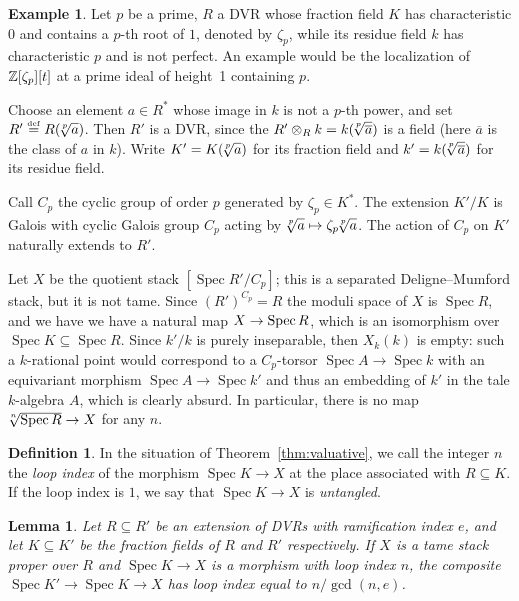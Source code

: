 \documentclass{amsart}
\numberwithin{equation}{section}
\numberwithin{subsection}{section}
\newtheorem{lemma}[theorem]{Lemma}
\theoremstyle{definition}
\newtheorem{definition}[theorem]{Definition}
\newtheorem{example}[theorem]{Example}
\theoremstyle{remark}
\newcommand\arr{\ifinner\to\else\longrightarrow\fi}
\newcommand{\eqdef}{\mathrel{\smash{\overset{\mathrm{\scriptscriptstyle def}} =}}}
\newcommand\spec{\operatorname{Spec}}
\newcommand\radice[2][\relax]{\hspace{-1.5pt}\sqrt[\uproot{2}#1]{#2}}
\begin{document}
\begin{example}\label{counter}
	Let $p$ be a prime, $R$ a DVR whose fraction field $K$ has characteristic $0$ and contains a $p$-th root of $1$, denoted by $\zeta_{p}$, while its residue field $k$ has characteristic $p$ and is not perfect. An example would be the localization of $\mathbb{Z}[\zeta_{p}][t]$ at a prime ideal of height~1 containing $p$.
	
	Choose an element $a\in R^{*}$ whose image in $k$ is not a $p$-th power, and set $R' \eqdef R(\radice[p]{a})$. Then $R'$ is a DVR, since the $R'\otimes_{R}k = k(\radice[p]{\overline{a}})$ is a field (here $\overline{a}$ is the class of $a$ in $k$). Write $K' = K(\radice[p]{a})$ for its fraction field and $k' = k(\radice[p]{\overline{a}})$ for its residue field.
	
	Call $C_{p}$ the cyclic group of order $p$ generated by $\zeta_{p} \in K^{*}$. The extension $K'/K$ is Galois with cyclic Galois group $C_{p}$ acting by $\radice[p]{a}\mapsto\zeta_{p}\radice[p]{a}$. The action of $C_{p}$ on $K'$ naturally extends to $R'$.
	
	Let $X$ be the quotient stack $[\spec R'/C_{p}]$; this is a separated Deligne--Mumford stack, but it is not tame. Since $(R')^{C_{p}} = R$ the moduli space of $X$ is $\spec R$, and we have  we have a natural map $X \arr \spec R$, which is an isomorphism over $\spec K \subseteq \spec R$. Since $k'/k$ is purely inseparable, then $X_{k}(k)$ is empty: such a $k$-rational point would correspond to a $C_{p}$-torsor $\spec A\to\spec k$ with an equivariant morphism $\spec A\to \spec k'$ and thus an embedding of $k'$ in the tale $k$-algebra $A$, which is clearly absurd. In particular, there is no map $\radice[n]{\spec R}\to X$ for any $n$.
\end{example}


\begin{definition}
	In the situation of Theorem~\ref{thm:valuative}, we call the integer $n$ the \emph{loop index} of the morphism $\spec K\to X$ at the place associated with $R \subseteq K$. If the loop index is $1$, we say that $\spec K\to X$ is \emph{untangled}.
\end{definition}

\begin{lemma}\label{loopram}
	Let $R \subseteq R'$ be an extension of DVRs with ramification index $e$, and let $K \subseteq K'$ be the fraction fields of $R$ and $R'$ respectively. If $X$ is a tame stack proper over $R$ and $\spec K\to X$ is a morphism with loop index $n$, the composite $\spec K' \to \spec K\to X$ has loop index equal to $n/\gcd(n,e)$.
\end{lemma}
\end{document}
